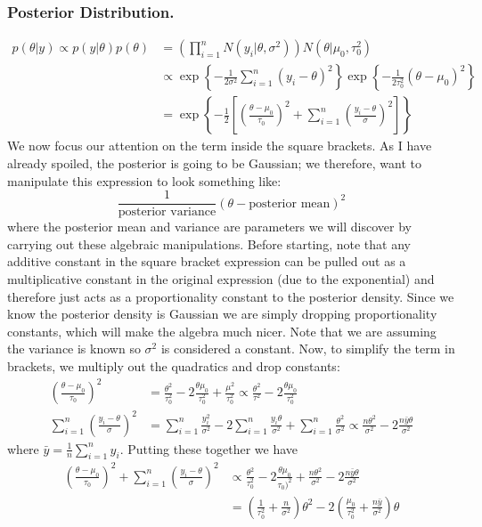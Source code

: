 \documentclass[12pt]{article}
\begin{document}
\subsubsection{Posterior Distribution.}
\begin{align*}
p(\theta|y) \propto p(y|\theta)p(\theta) &= \left(\prod_{i = 1}^{n} N(y_i|\theta, \sigma^2)\right)N(\theta|\mu_0, \tau_0^2) \\
							 &\propto \exp\left\{-\frac{1}{2\sigma^2} \sum_{i = 1}^{n} (y_i - \theta)^2 \right\} \exp\left\{-\frac{1}{2\tau_0^2}(\theta - \mu_0)^2 \right\} \\
							 &= \exp\left\{-\frac{1}{2} \left[\left(\frac{\theta - \mu_0}{\tau_0}\right)^2 + \sum_{i = 1}^{n} \left(\frac{y_i - \theta}{\sigma}\right)^2 \right]  \right\}
\end{align*}
We now focus our attention on the term inside the square brackets. As I have already spoiled, the posterior is going to be Gaussian; we therefore, want to manipulate this expression to look something like: 
\[\frac{1}{\text{posterior variance}}(\theta - \text{posterior mean})^2\]
where the posterior mean and variance are parameters we will discover by carrying out these algebraic manipulations. Before starting, note that any additive constant in the square bracket expression can be 
pulled out as a multiplicative constant in the original expression (due to the exponential) and therefore just acts as a proportionality constant to the posterior density. Since we know the posterior density is 
Gaussian we are simply dropping proportionality constants, which will make the algebra much nicer. Note that we are assuming the variance is known so $\sigma^2$ is considered a constant. 
Now, to simplify the term in brackets, we multiply out the quadratics and drop constants:  
\begin{align*}
\left(\frac{\theta - \mu_0}{\tau_0}\right)^2 &= \frac{\theta^2}{\tau_0^2} - 2\frac{\theta \mu_0}{\tau_0^2} + \frac{\mu^2}{\tau_0^2} \propto \frac{\theta^2}{\tau^2} - 2\frac{\theta \mu_0}{\tau_0^2} \\
\sum_{i = 1}^{n} \left(\frac{y_i - \theta}{\sigma}\right)^2 &= \sum_{i = 1}^{n}\frac{y_i^2}{\sigma^2} - 2\sum_{i = 1}^{n} \frac{y_i \theta}{\sigma^2} + \sum_{i = 1}^{n} \frac{\theta^2}{\sigma^2}
											\propto \frac{n \theta^2}{\sigma^2} - 2 \frac{n \bar{y} \theta}{\sigma^2}
\end{align*}
where $\bar{y} = \frac{1}{n} \sum_{i = 1}^{n} y_i$. Putting these together we have
\begin{align*}
\left(\frac{\theta - \mu_0}{\tau_0}\right)^2 + \sum_{i = 1}^{n} \left(\frac{y_i - \theta}{\sigma}\right)^2 &\propto \frac{\theta^2}{\tau_0^2} - 2\frac{\theta \mu_0}{\tau_0)^2} + \frac{n \theta^2}{\sigma^2} - 2 \frac{n \bar{y} \theta}{\sigma^2} \\
&= \left(\frac{1}{\tau_0^2} + \frac{n}{\sigma^2}\right)\theta^2 - 2 \left(\frac{\mu_0}{\tau_0^2} + \frac{n \bar{y}}{\sigma^2}\right)\theta
\end{align*}
\end{document}
